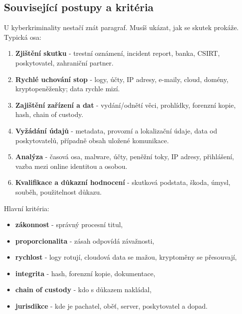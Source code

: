 
\subsection*{Související postupy a kritéria}
U kyberkriminality nestačí znát paragraf. Musíš ukázat, jak se skutek prokáže. Typická osa:
\begin{enumerate}
  \item \textbf{Zjištění skutku} - trestní oznámení, incident report, banka, CSIRT, poskytovatel, zahraniční partner.
  \item \textbf{Rychlé uchování stop} - logy, účty, IP adresy, e-maily, cloud, domény, kryptopeněženky; data rychle mizí.
  \item \textbf{Zajištění zařízení a dat} - vydání/odnětí věci, prohlídky, forenzní kopie, hash, chain of custody.
  \item \textbf{Vyžádání údajů} - metadata, provozní a lokalizační údaje, data od poskytovatelů, případně obsah uložené komunikace.
  \item \textbf{Analýza} - časová osa, malware, účty, peněžní toky, IP adresy, přihlášení, vazba mezi online identitou a osobou.
  \item \textbf{Kvalifikace a důkazní hodnocení} - skutková podstata, škoda, úmysl, souběh, použitelnost důkazu.
\end{enumerate}


Hlavní kritéria:
\begin{itemize}
  \item \textbf{zákonnost} - správný procesní titul,
  \item \textbf{proporcionalita} - zásah odpovídá závažnosti,
  \item \textbf{rychlost} - logy rotují, cloudová data se mažou, kryptoměny se přesouvají,
  \item \textbf{integrita} - hash, forenzní kopie, dokumentace,
  \item \textbf{chain of custody} - kdo s důkazem nakládal,
  \item \textbf{jurisdikce} - kde je pachatel, oběť, server, poskytovatel a dopad.
\end{itemize}

